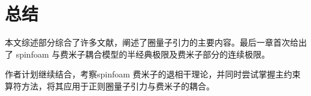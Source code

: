 
\chapter{总结}

	本文综述部分综合了许多文献，阐述了圈量子引力的主要内容。最后一章首次给出了 spinfoam 与费米子耦合模型的半经典极限及费米子部分的连续极限。

	作者计划继续结合\cite{Schroeren:2012eu}，考察spinfoam 费米子的退相干理论，并同时尝试掌握主约束算符方法，将其应用于正则圈量子引力与费米子的耦合。

